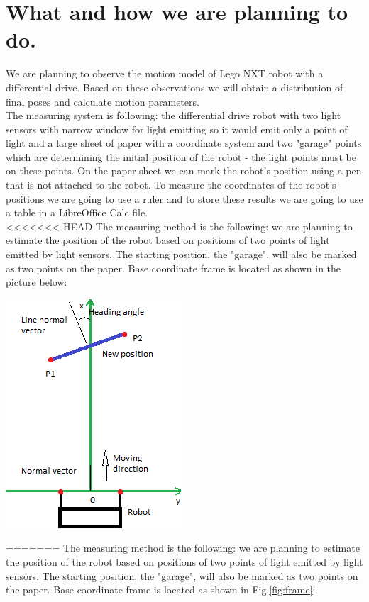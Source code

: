 \documentclass[a4paper, 12pt]{article}
\begin{document}
\section{What and how we are planning to do.}
We are planning to observe the motion model of Lego NXT robot with a differential drive. Based on these observations we will obtain a distribution of final poses and calculate motion parameters.\\
The measuring system is following: the differential drive robot with two light sensors with narrow window for light emitting so it would emit only a point of light and a large sheet of paper with a coordinate system and two "garage" points which are determining the initial position of the robot - the light points must be on these points. On the paper sheet we can mark the robot's position using a pen that is not attached to the robot. To measure the coordinates of the robot's positions we are going to use a ruler and to store these results we are going to use a table in a LibreOffice Calc file.\\
<<<<<<< HEAD
The measuring method is the following: we are planning to estimate the position of the robot based on positions of two points of light emitted by light sensors. The starting position, the "garage", will also be marked as two points on the paper.
Base coordinate frame is located as shown in the picture below:
\begin{center}
\includegraphics[scale =1]{frame.png}
\end{center}
=======
The measuring method is the following: we are planning to estimate the position of the robot based on positions of two points of light emitted by light sensors. The starting position, the "garage", will also be marked as two points on the paper. 
Base coordinate frame is located as shown in Fig.\ref{fig:frame}:
\end{document}
